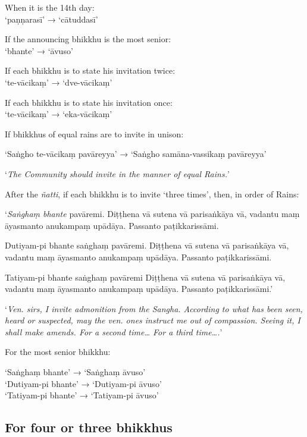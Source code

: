 
When it is the 14th day:\\
‘paṇṇarasī’ → ‘cātuddasī’

If the announcing bhikkhu is the most senior:\\
‘bhante’ → ‘āvuso’

If each bhikkhu is to state his invitation twice:\\
‘te-vācikaṃ’ → ‘dve-vācikaṃ’

If each bhikkhu is to state his invitation once:\\
‘te-vācikaṃ’ → ‘eka-vācikaṃ’

If bhikkhus of equal rains are to invite in unison:

‘Saṅgho te-vācikaṃ pavāreyya’ → ‘Saṅgho samāna-vassikaṃ pavāreyya’

‘\emph{The Community should invite in the manner of equal Rains.}’

After the \emph{ñatti}, if each bhikkhu is to invite ‘three times’, then, in
order of Rains:

\vspace*{\parskip}

\begin{paritta}
‘\emph{Saṅghaṃ bhante} pavāremi. Diṭṭhena vā sutena vā parisaṅkāya vā, vadantu
maṃ āyasmanto anukampaṃ upādāya. Passanto paṭikkarissāmi.

Dutiyam-pi bhante saṅghaṃ pavāremi. Diṭṭhena vā sutena vā parisaṅkāya vā,
vadantu maṃ āyasmanto anukampaṃ upādāya. Passanto paṭikkarissāmi.

Tatiyam-pi bhante saṅghaṃ pavāremi Diṭṭhena vā sutena vā parisaṅkāya vā, vadantu
maṃ āyasmanto anukampaṃ upādāya. Passanto paṭikkarissāmi.’
\end{paritta}

‘\emph{Ven. sirs, I invite admonition from the Sangha. According to what has
  been seen, heard or suspected, may the ven. ones instruct me out of
  compassion. Seeing it, I shall make amends. For a second time… For a third
  time….}’

For the most senior bhikkhu:

‘Saṅghaṃ bhante’ → ‘Saṅghaṃ āvuso’\\
‘Dutiyam-pi bhante’ → ‘Dutiyam-pi āvuso’\\
‘Tatiyam-pi bhante’ → ‘Tatiyam-pi āvuso’

\subsection{For four or three bhikkhus}

